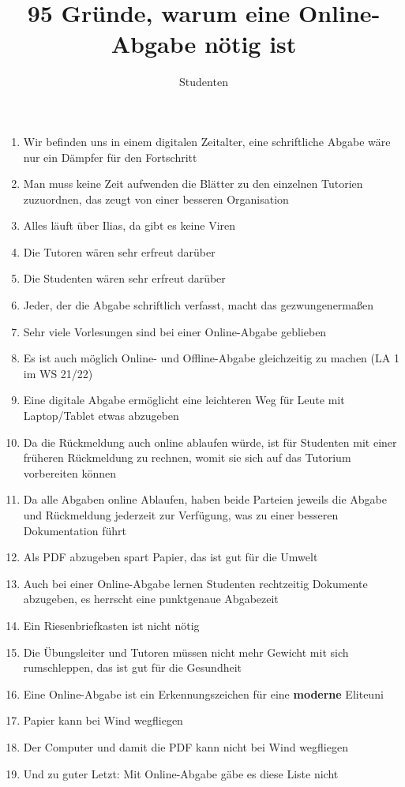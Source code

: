 \documentclass[a4paper]{article}
\title{95 Gründe, warum eine Online-Abgabe nötig ist}
\author{Studenten}
\begin{document}
\maketitle

\begin{enumerate}

	\item Wir befinden uns in einem digitalen Zeitalter, eine schriftliche Abgabe wäre nur ein Dämpfer für den Fortschritt
	\item Man muss keine Zeit aufwenden die Blätter zu den einzelnen Tutorien zuzuordnen, das zeugt von einer besseren Organisation
	\item Alles läuft über Ilias, da gibt es keine Viren
	\item Die Tutoren wären sehr erfreut darüber
	\item Die Studenten wären sehr erfreut darüber
	\item Jeder, der die Abgabe schriftlich verfasst, macht das gezwungenermaßen
	\item Sehr viele Vorlesungen sind bei einer Online-Abgabe geblieben
	\item Es ist auch möglich Online- und Offline-Abgabe gleichzeitig zu machen (LA 1 im WS 21/22)
	\item Eine digitale Abgabe ermöglicht eine leichteren Weg für Leute mit Laptop/Tablet etwas abzugeben
	\item Da die Rückmeldung auch online ablaufen würde, ist für Studenten mit einer früheren Rückmeldung zu rechnen, womit sie sich auf das Tutorium vorbereiten können
	\item Da alle Abgaben online Ablaufen, haben beide Parteien jeweils die Abgabe und Rückmeldung jederzeit zur Verfügung, was zu einer besseren Dokumentation führt
	\item Als PDF abzugeben spart Papier, das ist gut für die Umwelt
	\item Auch bei einer Online-Abgabe lernen Studenten rechtzeitig Dokumente abzugeben, es herrscht eine punktgenaue Abgabezeit
	\item Ein Riesenbriefkasten ist nicht nötig
	\item Die Übungsleiter und Tutoren müssen nicht mehr Gewicht mit sich rumschleppen, das ist gut für die Gesundheit
	\item Eine Online-Abgabe ist ein Erkennungszeichen für eine \textbf{moderne} Eliteuni
	\item Papier kann bei Wind wegfliegen
	\item Der Computer und damit die PDF kann nicht bei Wind wegfliegen
		
	\item Und zu guter Letzt: Mit Online-Abgabe gäbe es diese Liste nicht
\end{enumerate}
\end{document}
